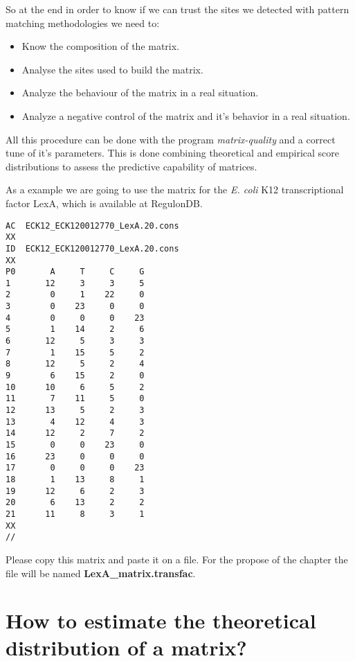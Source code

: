 So at the end in order to know if we can trust the sites we detected
with pattern matching methodologies we need to:

\begin{itemize}
\item Know the composition of the matrix.
\item Analyse the sites used to build the matrix.
\item Analyze the behaviour of the matrix in a real situation.
\item Analyze a negative control of the matrix and it's behavior in a
real situation.
\end{itemize}

All this procedure can be done with the program
\textit{matrix-quality} and a correct tune of it's parameters.
This is done combining theoretical and empirical score
distributions to assess the predictive capability of
matrices.

As a example we are going to use the matrix for the \textit{E. coli}
K12 transcriptional factor LexA, which is available at RegulonDB.

{\color{Blue} \begin{footnotesize} 
\begin{verbatim}
AC  ECK12_ECK120012770_LexA.20.cons
XX
ID  ECK12_ECK120012770_LexA.20.cons
XX
P0       A     T     C     G
1       12     3     3     5
2        0     1    22     0
3        0    23     0     0
4        0     0     0    23
5        1    14     2     6
6       12     5     3     3
7        1    15     5     2
8       12     5     2     4
9        6    15     2     0
10      10     6     5     2
11       7    11     5     0
12      13     5     2     3
13       4    12     4     3
14      12     2     7     2
15       0     0    23     0
16      23     0     0     0
17       0     0     0    23
18       1    13     8     1
19      12     6     2     3
20       6    13     2     2
21      11     8     3     1
XX
//
\end{verbatim} \end{footnotesize}
}

Please copy this matrix and paste it on a file. 
For the propose of the chapter the file will be named \textbf{LexA\_matrix.transfac}.  


\section{How to estimate the theoretical distribution of a matrix? }

